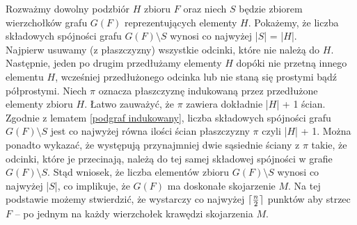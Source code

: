 \documentclass[brudnopis]{xmgr}
\DeclarePairedDelimiter\ceil{\lceil}{\rceil}
\theoremstyle{definition}
\begin{document}
\indent Rozważmy dowolny podzbiór $H$ zbioru $F$ oraz niech $S$ będzie zbiorem wierzchołków grafu $G(F)$ reprezentujących elementy $H$. Pokażemy, że liczba składowych spójności grafu $G(F) \setminus S$ wynosi co najwyżej |$S$| = |$H$|.
\\\indent Najpierw usuwamy (z płaszczyzny) wszystkie odcinki, które nie należą do $H$. Następnie, jeden po drugim przedłużamy elementy $H$ dopóki nie przetną innego elementu $H$, wcześniej przedłużonego odcinka lub nie staną się prostymi bądź półprostymi. Niech $\pi$ oznacza płaszczyznę indukowaną przez przedłużone elementy zbioru $H$. Łatwo zauważyć, że $\pi$ zawiera dokładnie |$H$| + 1 ścian. 
\\\indent Zgodnie z lematem \ref{podgraf indukowany}, liczba składowych spójności grafu $G(F) \setminus S$ jest co najwyżej równa ilości ścian płaszczyzny $\pi$ czyli |$H$| + 1. Można ponadto wykazać, że występują przynajmniej dwie sąsiednie ściany z $\pi$ takie, że odcinki, które je przecinają, należą do tej samej składowej spójności w grafie $G(F) \setminus S$. Stąd wniosek, że liczba elementów zbioru $G(F) \setminus S$ wynosi co najwyżej |$S$|, co implikuje, że $G(F)$ ma doskonałe skojarzenie $M$. Na tej podstawie możemy stwierdzić, że wystarczy co najwyżej $\ceil{\frac{n}{2}}$ punktów aby strzec $F$ -- po jednym na każdy wierzchołek krawędzi skojarzenia $M$.
\end{document}
